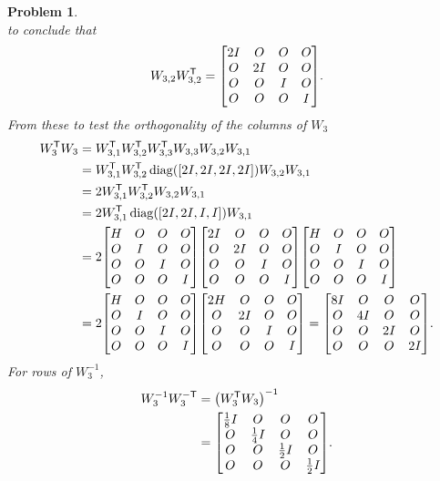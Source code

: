\documentclass{article}
\newcommand{\T}{\mathsf{T}}
\DeclareMathOperator{\diag}{diag}
\theoremstyle{pprop}
\newtheorem{problem}{Problem}[section]
\begin{document}
\begin{problem}
\[\]
to conclude that 
\[
W_{3,2} W_{3,2}^{\sf T} =
 \mqty[
2I & O & O & O \\
O & 2I & O & O \\
O & O & I & O \\
O & O & O & I 
 ] .
\]
From these to test the orthogonality of the columns of $W_3$
\begin{align*}
  W_3^{\sf T}W_3 & = W_{3,1}^{\sf T} W_{3,2}^{\sf T} W_{3,3}^{\sf T} W_{3,3} W_{3,2} W_{3,1} \\
  & = W_{3,1}^{\sf T} W_{3,2}^{\sf T} \diag([2I,2I,2I,2I]) W_{3,2} W_{3,1} \\
  & = 2 W_{3,1}^{\sf T} W_{3,2}^{\sf T} W_{3,2} W_{3,1} \\
  & = 2 W_{3,1}^{\sf T} \diag([2I,2I,I,I]) W_{3,1} \\
  & = 2 \mqty[H & O & O & O \\ O & I & O & O \\ O & O & I & O \\ O & O & O & I]
   \mqty[
2I & O & O & O \\
O & 2I & O & O \\
O & O & I & O \\
O & O & O & I 
 ] 
 \mqty[H & O & O & O \\ O & I & O & O \\ O & O & I & O \\ O & O & O & I] \\
 & = 2 \mqty[H & O & O & O \\ O & I & O & O \\ O & O & I & O \\ O & O & O & I]
 \mqty[2H & O & O & O \\ O & 2I & O & O \\ O & O & I & O \\ O & O & O & I]
 =  \mqty[8I & O & O & O \\ O & 4I & O & O \\ O & O & 2I & O \\ O & O & O & 2I].
\end{align*}
For rows of $W_3^{-1}$, 
\begin{align*}
  W_3^{-1}W_3^{-\sf T} & = \qty(W_3^\T W_3)^{-1} \\
  & =\mqty[ \frac18I & O & O & O \\ O & \frac14I & O & O \\ O & O & \frac12I & O \\ O & O & O & \frac12I \\]  .
\end{align*}

\end{problem}
\end{document}
